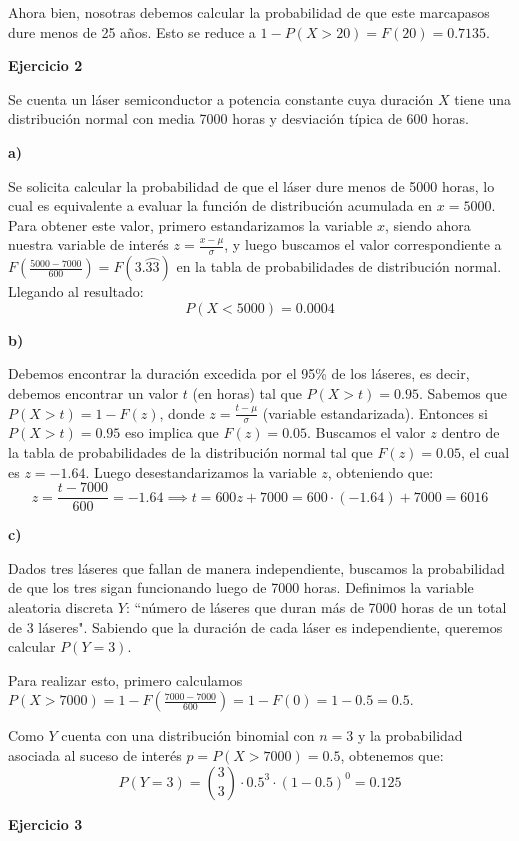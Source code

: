 \documentclass[11pt]{article}
\begin{document}
Ahora bien, nosotras debemos calcular la probabilidad de que este marcapasos dure menos de 25 a\~{n}os. Esto se reduce a $1 - P(X>20) = F(20) = 0.7135.$ 

\textbf{Ejercicio 2}

Se cuenta un láser semiconductor a potencia constante cuya duraci\'on $X$ tiene una distribuci\'on normal con media 7000 horas y desviaci\'on t\'ipica de 600 horas.

\textbf{a)}

Se solicita calcular la probabilidad de que el l\'aser dure menos de 5000 horas, lo cual es equivalente a evaluar la funci\'on de distribuci\'on acumulada en $x=5000$. Para obtener este valor, primero estandarizamos la variable $x$, siendo ahora nuestra variable de inter\'es $z = \frac{x - \mu}{\sigma}$, y luego buscamos el valor correspondiente a $F(\frac{5000-7000}{600}) = F(3.\wideparen{33})$ en la tabla de probabilidades de distribuci\'on normal. 
Llegando al resultado: $$P(X<5000) = 0.0004$$

\textbf{b)}

Debemos encontrar la duraci\'on excedida por el 95\% de los l\'aseres, es decir, debemos encontrar un valor $t$ (en horas) tal que $P(X>t) = 0.95$. Sabemos que $P(X>t) = 1 - F(z)$, donde $z = \frac{t - \mu}{\sigma}$ (variable estandarizada). Entonces si $P(X>t) = 0.95$ eso implica que $F(z) = 0.05$. 
Buscamos el valor $z$ dentro de la tabla de probabilidades de la distribuci\'on normal tal que $F(z) = 0.05$, el cual es $z = -1.64$. Luego desestandarizamos la variable $z$, obteniendo que: 
$$z = \frac{t - 7000}{600} = -1.64 \implies t = 600z + 7000 = 600 \cdot (-1.64) + 7000 = 6016$$

\textbf{c)}

Dados tres l\'aseres que fallan de manera independiente, buscamos la probabilidad de que los tres sigan funcionando luego de 7000 horas. Definimos la variable aleatoria discreta $Y$: ``n\'umero de l\'aseres que duran m\'as de 7000 horas de un total de 3 l\'aseres".
Sabiendo que la duraci\'on de cada l\'aser es independiente, queremos calcular $P(Y=3)$.

Para realizar esto, primero calculamos $P(X>7000) = 1 - F(\frac{7000-7000}{600}) = 1 - F(0) = 1 - 0.5 = 0.5$.

Como $Y$ cuenta con una distribuci\'on binomial con $n=3$ y la probabilidad asociada al suceso de inter\'es $p=P(X>7000)=0.5$, obtenemos que:
$$P(Y=3) = \binom{3}{3} \cdot 0.5^3 \cdot (1 - 0.5)^0 = 0.125$$ 

\textbf{Ejercicio 3}
\end{document}
